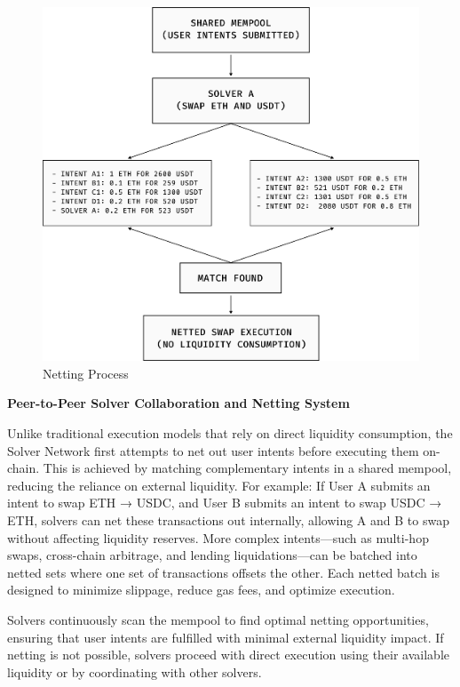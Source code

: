 \begin{figure}[h]
    \centering
    \includegraphics[width=0.9\linewidth]{figure/Netting.png}
    \caption{Netting Process}
    \label{fig:netting}
\end{figure}

\textbf{Peer-to-Peer Solver Collaboration and Netting System}

Unlike traditional execution models that rely on direct liquidity consumption, the Solver Network first attempts to net out user intents before executing them on-chain. This is achieved by matching complementary intents in a shared mempool, reducing the reliance on external liquidity. For example: If User A submits an intent to swap ETH → USDC, and User B submits an intent to swap USDC → ETH, solvers can net these transactions out internally, allowing A and B to swap without affecting liquidity reserves. More complex intents—such as multi-hop swaps, cross-chain arbitrage, and lending liquidations—can be batched into netted sets where one set of transactions offsets the other. Each netted batch is designed to minimize slippage, reduce gas fees, and optimize execution.

Solvers continuously scan the mempool to find optimal netting opportunities, ensuring that user intents are fulfilled with minimal external liquidity impact. If netting is not possible, solvers proceed with direct execution using their available liquidity or by coordinating with other solvers.

